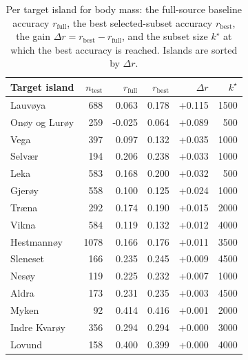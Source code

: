 \begin{table}[!ht]
\centering
\renewcommand{\arraystretch}{1.08}
\small
\setlength{\tabcolsep}{6pt}
\begin{tabular}{@{}lrrrrr@{}}
\toprule
\textbf{Target island} & \textbf{$n_{\mathrm{test}}$} & \textbf{$r_{\mathrm{full}}$} & \textbf{$r_{\mathrm{best}}$} & \textbf{$\Delta r$} & \textbf{$k^{\star}$} \\
\midrule
Lauvøya & 688 & 0.063 & 0.178 & +0.115 & 1500 \\
Onøy og Lurøy & 259 & -0.025 & 0.064 & +0.089 & 500 \\
Vega & 397 & 0.097 & 0.132 & +0.035 & 1000 \\
Selvær & 194 & 0.206 & 0.238 & +0.033 & 1000 \\
Leka & 583 & 0.168 & 0.200 & +0.032 & 500 \\
Gjerøy & 558 & 0.100 & 0.125 & +0.024 & 1000 \\
Træna & 292 & 0.174 & 0.190 & +0.015 & 2000 \\
Vikna & 584 & 0.119 & 0.132 & +0.012 & 4000 \\
Hestmannøy & 1078 & 0.166 & 0.176 & +0.011 & 3500 \\
Sleneset & 166 & 0.235 & 0.245 & +0.009 & 4500 \\
Nesøy & 119 & 0.225 & 0.232 & +0.007 & 1000 \\
Aldra & 173 & 0.231 & 0.235 & +0.003 & 4500 \\
Myken & 92 & 0.414 & 0.416 & +0.001 & 2000 \\
Indre Kvarøy & 356 & 0.294 & 0.294 & +0.000 & 3000 \\
Lovund & 158 & 0.400 & 0.399 & +0.000 & 4000 \\
\bottomrule
\end{tabular}
\caption[Per-island subset-selection gain]{Per target island for body mass: the full-source baseline accuracy $r_{\mathrm{full}}$, the best selected-subset accuracy $r_{\mathrm{best}}$, the gain $\Delta r = r_{\mathrm{best}} - r_{\mathrm{full}}$, and the subset size $k^{\star}$ at which the best accuracy is reached. Islands are sorted by $\Delta r$.}
\label{tab:selection_per_island}
\end{table}
